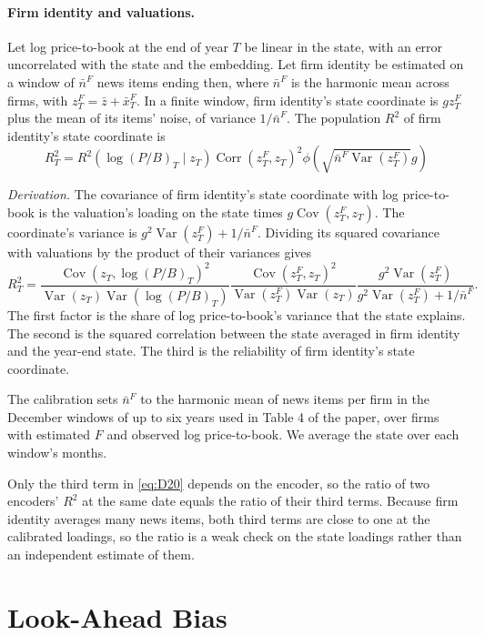 \documentclass[11pt,letterpaper]{article}
\theoremstyle{remark}
\DeclareMathOperator{\Var}{Var}
\DeclareMathOperator{\Cov}{Cov}
\DeclareMathOperator{\Corr}{Corr}
\begin{document}
\paragraph{Firm identity and valuations.}
Let log price-to-book at the end of year $T$ be linear in the state, with an error uncorrelated with the state and the embedding. Let firm identity be estimated on a window of $\bar n^F$ news items ending then, where $\bar n^F$ is the harmonic mean across firms, with $z^F_T=\bar z+\bar x^F_T$. In a finite window, firm identity's state coordinate is $gz^F_T$ plus the mean of its items' noise, of variance $1/\bar n^F$. The population $R^2$ of firm identity's state coordinate is
\begin{equation}\label{eq:D20}
R^2_T
=R^2\left(\log(P/B)_T\mid z_T\right)
\Corr\left(z^F_T,z_T\right)^2
\phi\left(\sqrt{\bar n^F\Var(z^F_T)}g\right)
\end{equation}

\emph{Derivation.}
The covariance of firm identity's state coordinate with log price-to-book is the valuation's loading on the state times $g\Cov(z^F_T,z_T)$. The coordinate's variance is $g^2\Var(z^F_T)+1/\bar n^F$. Dividing its squared covariance with valuations by the product of their variances gives
\[
R^2_T
=
\frac{\Cov(z_T,\log(P/B)_T)^2}
{\Var(z_T)\Var(\log(P/B)_T)}
\frac{\Cov(z^F_T,z_T)^2}
{\Var(z^F_T)\Var(z_T)}
\frac{g^2\Var(z^F_T)}
{g^2\Var(z^F_T)+1/\bar n^F}.
\]
The first factor is the share of log price-to-book's variance that the state explains. The second is the squared correlation between the state averaged in firm identity and the year-end state. The third is the reliability of firm identity's state coordinate.

The calibration sets $\bar n^F$ to the harmonic mean of news items per firm in the December windows of up to six years used in Table 4 of the paper, over firms with estimated $F$ and observed log price-to-book. We average the state over each window's months.

Only the third term in \eqref{eq:D20} depends on the encoder, so the ratio of two encoders' $R^2$ at the same date equals the ratio of their third terms. Because firm identity averages many news items, both third terms are close to one at the calibrated loadings, so the ratio is a weak check on the state loadings rather than an independent estimate of them.

\section{Look-Ahead Bias}\label{sec:lookahead}
\end{document}
